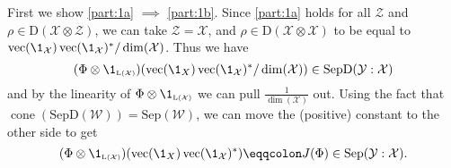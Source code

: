 \documentclass[boxes,pages,color=SeaGreen]{homework}
\newcommand{\X}{\mathcal{X}}
\newcommand{\Y}{\mathcal{Y}}
\newcommand{\Z}{\mathcal{Z}}
\newcommand{\W}{\mathcal{W}}
\newcommand{\Lin}{\mathrm{L}}
\newcommand{\Density}{\mathrm{D}}
\newcommand{\Sep}{\mathrm{Sep}}
\newcommand{\SepD}{\mathrm{SepD}}
\DeclareMathOperator{\vect}{vec}
\DeclareMathOperator{\cone}{cone}
\begin{document}
\begin{solution}
  First we show \ref{part:1a} $\implies$ \ref{part:1b}.
  Since \ref{part:1a} holds for all $\Z$ and $\rho\in\Density(\X\otimes\Z)$, we can take $\Z = \X$, and $\rho\in\Density(\X\otimes\X)$ to be equal to $\vect(\1_\X)\vect(\1_\X)^* / \dim(\X)$.
  Thus we have
  \begin{equation*}
    (\Phi \otimes \1_{\mathsmaller{\Lin(\X)}})(\vect(\1_X)\vect(\1_\X)^*/\dim(\X))\in\SepD(\Y : \X)
  \end{equation*}
  and by the linearity of $\Phi\otimes\1_\mathsmaller{\Lin(\X)}$ we can pull $\frac{1}{\dim(\X)}$ out.
  Using the fact that $\cone(\SepD(\W)) = \Sep(\W)$, we can move the (positive) constant to the other side to get
  \begin{equation*}
    (\Phi \otimes \1_{\mathsmaller{\Lin(\X)}})(\vect(\1_X)\vect(\1_\X)^*) \eqdef J(\Phi) \in \Sep(\Y : \X).
  \end{equation*}


\end{solution}
\end{document}
